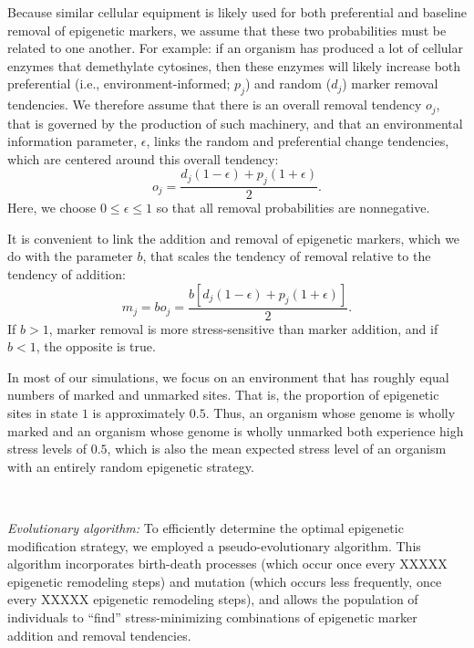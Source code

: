 \documentclass{article}
\begin{document}
Because similar cellular equipment is likely used for both preferential and baseline removal of epigenetic markers, we assume that these two probabilities must be related to one another. For example: if an organism has produced a lot of cellular enzymes that demethylate cytosines, then these enzymes will likely increase both preferential (i.e., environment-informed; $p_j$) and random ($d_j$) marker removal tendencies. We therefore assume that there is an overall removal tendency $o_j$, that is governed by the production of such machinery, and that an environmental information parameter, $\epsilon$, links the random and preferential change tendencies, which are centered around this overall tendency:
\begin{equation}
    o_j = \frac{ d_j\left( 1 - \epsilon \right) + p_j \left( 1+ \epsilon \right) }{2}.
\end{equation}
Here, we choose $0 \leq \epsilon \leq 1$ so that all removal probabilities are nonnegative.

It is convenient to link the addition and removal of epigenetic markers, which we do with the parameter $b$, that scales the tendency of removal relative to the tendency of addition:
\begin{equation}
    m_j = b o_j = \frac{b\left[ d_j\left( 1 - \epsilon \right) + p_j \left( 1+ \epsilon \right) \right]}{2}.
\end{equation}
If $b > 1$, marker removal is more stress-sensitive than marker addition, and if $b < 1$, the opposite is true.

In most of our simulations, we focus on an environment that has roughly equal numbers of marked and unmarked sites. That is, the proportion of epigenetic sites in state $1$ is approximately $0.5$. Thus, an organism whose genome is wholly marked and an organism whose genome is wholly unmarked both experience high stress levels of $0.5$, which is also the mean expected stress level of an organism with an entirely random epigenetic strategy. %

\ 




\noindent \textit{Evolutionary algorithm:} To efficiently determine the optimal epigenetic modification strategy, we employed a pseudo-evolutionary algorithm. This algorithm incorporates birth-death processes (which occur once every XXXXX epigenetic remodeling steps) and mutation (which occurs less frequently, once every XXXXX epigenetic remodeling steps), and allows the population of individuals to ``find'' stress-minimizing combinations of epigenetic marker addition and removal tendencies.
\end{document}
